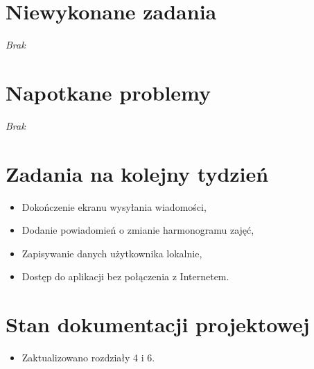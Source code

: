 \documentclass[12pt,a4paper]{mwart}
\begin{document}
\section{Niewykonane zadania}
\textit{Brak}

\section{Napotkane problemy}
\textit{Brak}

\section{Zadania na kolejny tydzień}
\begin{itemize}
	\item Dokończenie ekranu wysyłania wiadomości,
	\item Dodanie powiadomień o zmianie harmonogramu zajęć,
	\item Zapisywanie danych użytkownika lokalnie,
	\item Dostęp do aplikacji bez połączenia z Internetem.
\end{itemize}

\section{Stan dokumentacji projektowej}
\begin{itemize}
	\item Zaktualizowano rozdziały 4 i 6.
\end{itemize}
\end{document}
